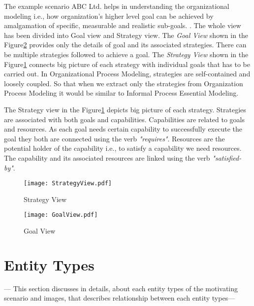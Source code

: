  The example scenario ABC Ltd. helps in understanding the organizational modeling i.e., how organization's higher level goal can be achieved by amalgamation of specific, measurable and realistic sub-goals. . The whole view has been divided into Goal view and Strategy view. The \textit{Goal View} shown in the Figure\ref{fig:goalview} provides only the details of goal and its associated strategies. There can be multiple strategies followed to achieve a goal. The \textit{Strategy View} shown in the Figure\ref{fig:strategyview} connects big picture of each strategy with individual goals that has to be carried out. In Organizational Process Modeling, strategies are self-contained and loosely coupled. So that when we extract only the strategies from Organization Process Modeling it would be similar to Informal Process Essential Modeling. 

 The Strategy view  in the Figure\ref{fig:strategyview} depicts big picture of each strategy. Strategies are associated with both goals and capabilities. Capabilities are related to goals and resources. As each goal needs certain capability to successfully execute the goal they both are connected using the verb \textit{"requires"}. Resources are the potential holder of the capability i.e., to satisfy a capability we need resources. The capability and its associated resources are linked using the verb \textit{"satisfied-by"}. 


\begin{figure}
	\centering
	\texttt{[image: StrategyView.pdf]}
	\caption{Strategy View}
	\label{fig:strategyview}
\end{figure}

\begin{figure}
	\centering
	\texttt{[image: GoalView.pdf]}
	\caption{Goal View}
	\label{fig:goalview}
\end{figure}

\section{Entity Types}
\label{sec:entities}
 --- This section discusses in details, about each entity types of the motivating scenario and images,
 that describes relationship between each entity types---
 

